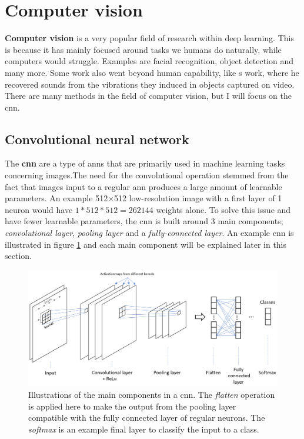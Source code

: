     
\clearpage
\section{Computer vision} \label{computer vision}
    \textbf{Computer vision} is a very popular field of research within deep learning\cite{voulodimos2018deep_computer_vision}. This is because it has mainly focused around tasks we humans do naturally, while computers would struggle. Examples are facial recognition, object detection and many more. Some work also went beyond human capability, like \citeauthor{davis2014visual_deep_video_audio}s\cite{davis2014visual_deep_video_audio} work, where he recovered sounds from the vibrations they induced in objects captured on video. There are many methods in the field of computer vision, but I will focus on the \gls{cnn}.
    
    
    
\subsection{Convolutional neural network} \label{cnn}
    The \textbf{\gls{cnn}} are a type of \gls{ann}s that are primarily used in machine learning tasks concerning images\cite{o2015introduction_convolutions}.The need for the convolutional operation stemmed from the fact that images input to a regular \gls{ann} produces a large amount of learnable parameters. An example 512×512 low-resolution image with a first layer of 1 neuron would have $1*512*512 = 262144$ weights alone.  To solve this issue and have fewer learnable parameters, the \gls{cnn} is built around 3 main components\cite{o2015introduction_convolutions}; \textit{convolutional layer}, \textit{pooling layer} and a \textit{fully-connected layer}. An example \gls{cnn} is illustrated in figure \ref{convolutional_neural_network_fig} and each main component will be explained later in this section.

    \begin{figure}[H]
        \centering
        \includegraphics[scale=0.4]{figures/conv_net.png}
        \caption[Convolutional neural network example]{Illustrations of the main components in a \gls{cnn}. The \textit{flatten} operation is applied here to make the output from the pooling layer compatible with the fully connected layer of regular neurons. The \textit{softmax} is an example final layer to classify the input to a class.}
      	\medskip 
        \label{convolutional_neural_network_fig}
    \end{figure}
    
